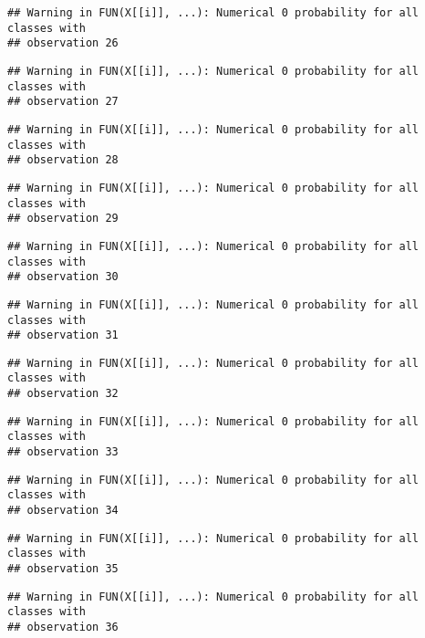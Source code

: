 \documentclass[
]{article}
\begin{document}
\begin{verbatim}
## Warning in FUN(X[[i]], ...): Numerical 0 probability for all classes with
## observation 26
\end{verbatim}

\begin{verbatim}
## Warning in FUN(X[[i]], ...): Numerical 0 probability for all classes with
## observation 27
\end{verbatim}

\begin{verbatim}
## Warning in FUN(X[[i]], ...): Numerical 0 probability for all classes with
## observation 28
\end{verbatim}

\begin{verbatim}
## Warning in FUN(X[[i]], ...): Numerical 0 probability for all classes with
## observation 29
\end{verbatim}

\begin{verbatim}
## Warning in FUN(X[[i]], ...): Numerical 0 probability for all classes with
## observation 30
\end{verbatim}

\begin{verbatim}
## Warning in FUN(X[[i]], ...): Numerical 0 probability for all classes with
## observation 31
\end{verbatim}

\begin{verbatim}
## Warning in FUN(X[[i]], ...): Numerical 0 probability for all classes with
## observation 32
\end{verbatim}

\begin{verbatim}
## Warning in FUN(X[[i]], ...): Numerical 0 probability for all classes with
## observation 33
\end{verbatim}

\begin{verbatim}
## Warning in FUN(X[[i]], ...): Numerical 0 probability for all classes with
## observation 34
\end{verbatim}

\begin{verbatim}
## Warning in FUN(X[[i]], ...): Numerical 0 probability for all classes with
## observation 35
\end{verbatim}

\begin{verbatim}
## Warning in FUN(X[[i]], ...): Numerical 0 probability for all classes with
## observation 36
\end{verbatim}
\end{document}
